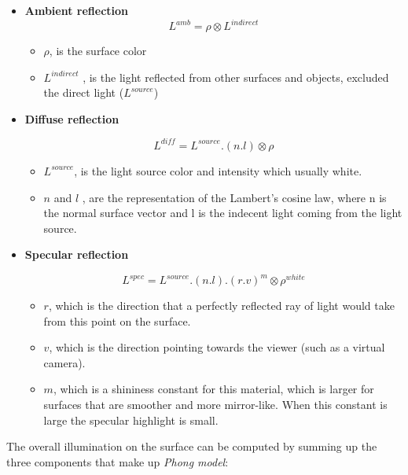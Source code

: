 \documentclass{article}
\begin{document}
\begin{itemize}
	\item \textbf{Ambient reflection}
		\begin{equation}
L^{amb} = \rho \otimes L^{indirect}
		\end{equation}
	
	\begin{itemize}
		\item $\rho$, is the surface color
		\item $L^{indirect}$ , is the light reflected from other surfaces and objects, excluded the direct light ($L^{source}$)
	\end{itemize}
	\item \textbf{Diffuse reflection} 

					\begin{equation}
L^{diff} =  L^{source}.(n.l) \otimes \rho 
			\end{equation}
				\begin{itemize}
		\item $L^{source}$, is the light source color and intensity which usually white. 
		\item $n$ and $l$ , are the representation of the Lambert's cosine law, where n is the normal surface vector  and l is the indecent light coming from the light source.
	\end{itemize}
	\item \textbf{Specular reflection} 

								\begin{equation}
L^{spec} =  L^{source}.(n.l).(r.v)^m \otimes \rho^{white} 
			\end{equation}
				\begin{itemize}
		\item $r$, which is the direction that a perfectly reflected ray of light would take from this point on the surface. 
		\item $v$, which is the direction pointing towards the viewer (such as a virtual camera).
		\item $m$, which is a shininess constant for this material, which is larger for surfaces that are smoother and more mirror-like. When this constant is large the specular highlight is small.
	\end{itemize}
\end{itemize}

The overall illumination on the surface can be computed by summing up the three components that make up \textit{Phong model}:
\end{document}

